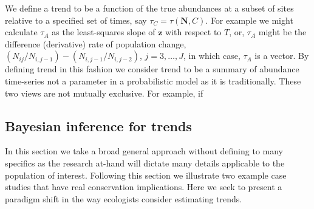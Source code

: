 \documentclass[12pt,letter]{article}
\newcommand{\Nij}{\ensuremath{N_{ij}}}
\begin{document}
We define a trend to be a function of the true abundances at a subset of sites relative to a specified set of times, say $\tau_C=\tau(\mathbf{N}, C)$. For example we might calculate $\tau_A$ as the least-squares slope of $\mathbf{z}$ with respect to $T$, or, $\tau_A$ might be the difference (derivative) rate of population change, $(\Nij/N_{i,j-1}) - (N_{i,j-1}/N_{i,j-2})$, $j=3,\dots,J$, in which case, $\tau_A$ is a vector. By defining trend in this fashion we consider trend to be a summary of abundance time-series not a parameter in a probabilistic model as it is traditionally. These two views are not mutually exclusive. For example, if 
 
\subsection{Bayesian inference for trends}

In this section we take a broad general approach without defining to many specifics as the research at-hand will dictate many details applicable to the population of interest. Following this section we illustrate two example case studies that have real conservation implications. Here we seek to present a paradigm shift in the way ecologists consider estimating trends. 
\end{document}

